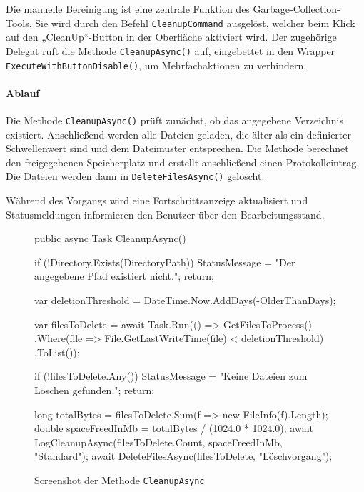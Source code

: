 

Die manuelle Bereinigung ist eine zentrale Funktion des Garbage-Collection-Tools. Sie wird durch den Befehl \texttt{CleanupCommand} ausgelöst, welcher beim Klick auf den „CleanUp“-Button in der Oberfläche aktiviert wird. Der zugehörige Delegat ruft die Methode \texttt{CleanupAsync()} auf, eingebettet in den Wrapper \texttt{ExecuteWithButtonDisable()}, um Mehrfachaktionen zu verhindern.

\paragraph{Ablauf}
Die Methode \texttt{CleanupAsync()} prüft zunächst, ob das angegebene Verzeichnis existiert. Anschließend werden alle Dateien geladen, die älter als ein definierter Schwellenwert sind und dem Dateimuster entsprechen. Die Methode berechnet den freigegebenen Speicherplatz und erstellt anschließend einen Protokolleintrag. Die Dateien werden dann in \texttt{DeleteFilesAsync()} gelöscht.

Während des Vorgangs wird eine Fortschrittsanzeige aktualisiert und Statusmeldungen informieren den Benutzer über den Bearbeitungsstand.

\begin{figure}[H]
    \centering
    \begin{cs}
public async Task CleanupAsync()
{
    if (!Directory.Exists(DirectoryPath))
    {
        StatusMessage = "Der angegebene Pfad existiert nicht.";
        return;
    }

    var deletionThreshold = DateTime.Now.AddDays(-OlderThanDays);
        
    var filesToDelete = await Task.Run(() => GetFilesToProcess()
        .Where(file => File.GetLastWriteTime(file) < deletionThreshold)
        .ToList());

    if (!filesToDelete.Any())
    {
        StatusMessage = "Keine Dateien zum Löschen gefunden.";
        return;
    }

    long totalBytes = filesToDelete.Sum(f => new FileInfo(f).Length);
    double spaceFreedInMb = totalBytes / (1024.0 * 1024.0);
    await LogCleanupAsync(filesToDelete.Count, spaceFreedInMb, "Standard");
    await DeleteFilesAsync(filesToDelete, "Löschvorgang");
}
\end{cs}
    \caption{Screenshot der Methode \texttt{CleanupAsync}}
\end{figure}

